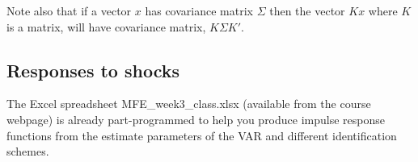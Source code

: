 \documentclass[authoryear,11pt]{elsarticle}
\begin{document}
Note also that if a vector $x$ has covariance matrix $\Sigma$ then the vector $Kx$ where $K$ is a matrix, will have covariance matrix, $K \Sigma K'$.


\subsection{Responses to shocks}
The Excel spreadsheet MFE\_week3\_class.xlsx (available from the course webpage) is already part-programmed to help you produce impulse response functions from the estimate parameters of the VAR and different identification schemes.
\end{document}
